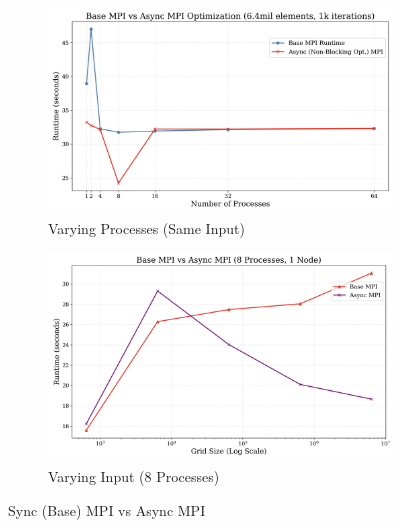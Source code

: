 \documentclass[a4paper,10pt]{article}
\begin{document}
\begin{figure}[t]
     \centering
     \begin{subfigure}[b]{0.45\textwidth}
         \centering
         \includegraphics[width=\textwidth]{../images/4_opt/opt1.png}
         \caption{Varying Processes (Same Input)}
         \label{fig:4_opt1}
     \end{subfigure}
     \hfill
     \begin{subfigure}[b]{0.45\textwidth}
         \centering
         \includegraphics[width=\textwidth]{../images/4_opt/opt_compare_8.png}
         \caption{Varying Input (8 Processes)}
         \label{fig:4_opt_compare_8}
     \end{subfigure}
     \caption{Sync (Base) MPI vs Async MPI}
     \label{fig:4_opt_async_runtimes}
\end{figure}
\end{document}
